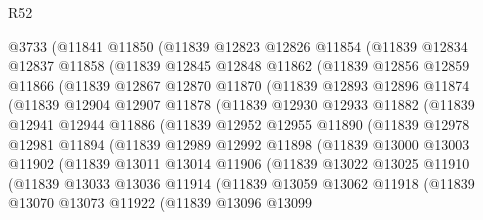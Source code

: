 \begin{lexlean}{R52}
\begin{coremodule}
    @3733
      (@11841
        @11850
        (@11839
          @12823
          @12826
          @11854
          (@11839
            @12834
            @12837
            @11858
            (@11839
              @12845
              @12848
              @11862
              (@11839
                @12856
                @12859
                @11866
                (@11839
                  @12867
                  @12870
                  @11870
                  (@11839
                    @12893
                    @12896
                    @11874
                    (@11839
                      @12904
                      @12907
                      @11878
                      (@11839
                        @12930
                        @12933
                        @11882
                        (@11839
                          @12941
                          @12944
                          @11886
                          (@11839
                            @12952
                            @12955
                            @11890
                            (@11839
                              @12978
                              @12981
                              @11894
                              (@11839
                                @12989
                                @12992
                                @11898
                                (@11839
                                  @13000
                                  @13003
                                  @11902
                                  (@11839
                                    @13011
                                    @13014
                                    @11906
                                    (@11839
                                      @13022
                                      @13025
                                      @11910
                                      (@11839
                                        @13033
                                        @13036
                                        @11914
                                        (@11839
                                          @13059
                                          @13062
                                          @11918
                                          (@11839
                                            @13070
                                            @13073
                                            @11922
                                            (@11839
                                              @13096
                                              @13099

\end{coremodule}
\end{lexlean}
